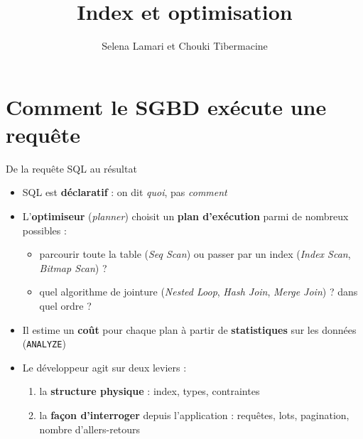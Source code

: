 \documentclass[aspectratio=169,10pt]{beamer}
\title{Index et optimisation}
\author[C. Tibermacine]{Selena Lamari et Chouki Tibermacine}
\date{}
\begin{document}

\section{Comment le SGBD ex\'ecute une requ\^ete}

\begin{frame}{De la requ\^ete SQL au r\'esultat}
  \begin{itemize}
    \item SQL est \textbf{d\'eclaratif} : on dit \emph{quoi}, pas \emph{comment}
    \item L'\textbf{optimiseur} (\textit{planner}) choisit un \textbf{plan d'ex\'ecution} parmi de nombreux possibles :
      \begin{itemize}
        \item parcourir toute la table (\textit{Seq Scan}) ou passer par un index (\textit{Index Scan}, \textit{Bitmap Scan}) ?
        \item quel algorithme de jointure (\textit{Nested Loop}, \textit{Hash Join}, \textit{Merge Join}) ? dans quel ordre ?
      \end{itemize}
    \item Il estime un \textbf{co\^ut} pour chaque plan \`a partir de \textbf{statistiques} sur les donn\'ees (\texttt{ANALYZE})
    \item Le d\'eveloppeur agit sur deux leviers :
      \begin{enumerate}
        \item la \textbf{structure physique} : index, types, contraintes
        \item la \textbf{fa\c{c}on d'interroger} depuis l'application : requ\^etes, lots, pagination, nombre d'allers-retours
      \end{enumerate}
  \end{itemize}
\end{frame}
\end{document}
